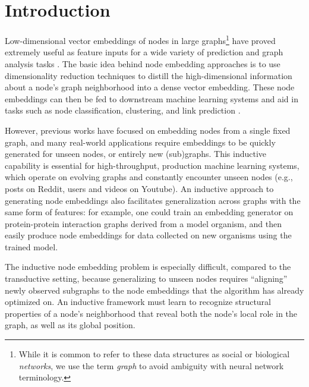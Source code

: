 
\section{Introduction}
\label{inductive:sec:intro}

Low-dimensional  vector embeddings of nodes in large graphs\footnote{While it is common to refer to these data structures as social or biological \emph{networks}, we use the term \emph{graph} to avoid ambiguity with neural network terminology.} have proved extremely useful as feature inputs for a wide variety of prediction and graph analysis tasks \cite{cao2015grarep,grover2016node2vec,perozzi2014deepwalk,tang2015line,wang2016structural}.
The basic idea behind node embedding approaches is to use dimensionality reduction techniques to distill the high-dimensional information about a node's graph neighborhood into a dense vector embedding. 
These node embeddings can then be fed to downstream machine learning systems and aid in tasks such as node classification, clustering, and link prediction \cite{grover2016node2vec,perozzi2014deepwalk,tang2015line}.

However, previous works have focused on embedding nodes from a single fixed graph, and many real-world applications require embeddings to be quickly generated for unseen nodes, or entirely new (sub)graphs. 
This inductive capability is essential for high-throughput, production machine learning systems, which operate on evolving graphs and constantly encounter unseen nodes (e.g., posts on Reddit, users and videos on Youtube).
An inductive approach to generating node embeddings also facilitates generalization across graphs with the same form of features:
for example, one could train an embedding generator on protein-protein interaction graphs derived from a model organism, and then easily produce node embeddings for data collected on new organisms using the trained model. 

The inductive node embedding problem is especially difficult, compared to the transductive setting, because generalizing to unseen nodes  requires ``aligning'' newly observed subgraphs to the node embeddings that the algorithm has already optimized on. 
An inductive framework must learn to recognize structural properties of a node's neighborhood that reveal both the node's local role in the graph, as well as its global position. 
 
